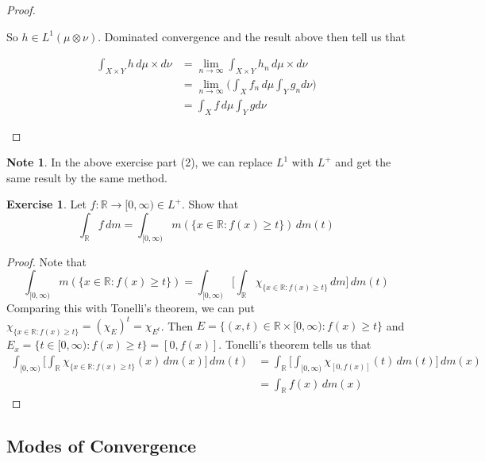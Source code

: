 \documentclass[12pt]{amsart}
\theoremstyle{definition}
\newtheorem{note}[definition]{Note}
\newtheorem{ex}[definition]{Exercise}
\newcommand{\R}{\mathbb{R}}
\newcommand{\dm}{\, d m}
\newcommand{\dmu}{\, d \mu}
\newcommand{\Rg}{[0,\infty)}
\newcommand{\limn}{\lim \limits_{n \rightarrow \infty}}
\newcommand{\lex}[1]{\label{ex:#1}}
\begin{document}
\begin{proof}
\begin{enumerate}
			So $h \in L^1(\mu \otimes \nu)$. Dominated convergence and the result above then tell us that 
			
			\begin{align*}
				\int_{X \times Y} h \dmu \times d\nu 
				&= \limn \int_{X \times Y} h_n \dmu \times d\nu \\
				&= \limn \bigg( \int_X f_n \dmu \int_Y g_n d\nu \bigg)\\
				&= \int_X f \dmu \int_Y g d\nu
			\end{align*}
			
		\end{enumerate}
	\end{proof}
	
	\begin{note}
		In the above exercise part (2), we can replace $L^1$ with $L^+$ and get the same result by the same method.
	\end{note}
	
	\begin{ex} \lex{00000} 
		Let $f:\R \rightarrow \Rg \in L^+$. Show that $$\int_{\R}f\dm = \int_{\Rg}m(\{x \in \R: f(x) \geq t\}) \dm(t)$$
	\end{ex}
	
	\begin{proof}
		Note that $$\int_{\Rg}m(\{x \in \R: f(x) \geq t\}) = \int_{\Rg} \bigg[\int_{\R} \chi_{\{x \in \R: f(x) \geq t\}}\dm \bigg]\dm(t)$$
		Comparing this with Tonelli's theorem, we can put $\chi_{\{x \in \R: f(x) \geq t\}} = (\chi_{E})^t = \chi_{E^t}$. Then $E = \{(x,t) \in \R \times \Rg: f(x) \geq t\}$ and $E_x = \{t \in \Rg: f(x) \geq t\} = [0,f(x)]$. Tonelli's theorem tells us that 
		\begin{align*}
			\int_{\Rg} \bigg[\int_{\R} \chi_{\{x \in \R: f(x) \geq t\}}(x) \dm(x) \bigg]\dm(t)
			&= \int_{\R} \bigg[ \int_{\Rg} \chi_{[0,f(x)]}(t) \dm(t) \bigg] \dm(x)\\
			&= \int_{\R} f(x) \dm(x)
		\end{align*} 
	\end{proof}
	
	
	
	
	
	
	
	
	
	
	
	
	
	
	\newpage
	\subsection{Modes of Convergence}
	
\end{document}
